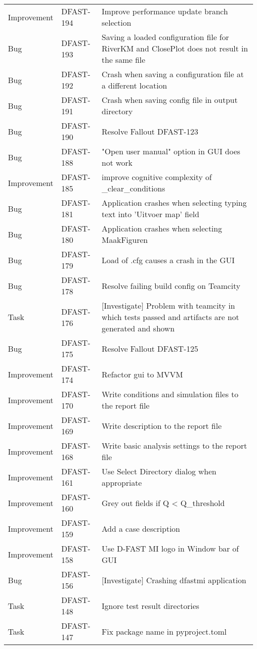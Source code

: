 \documentclass{deltares_memo}
\begin{document}
\begin{longtable}{l|l|p{8cm}}
Improvement & DFAST-194 & Improve performance update branch selection \\
Bug & DFAST-193 & Saving a loaded configuration file for RiverKM and ClosePlot does not result in the same file \\
Bug & DFAST-192 & Crash when saving a configuration file at a different location \\
Bug & DFAST-191 & Crash when saving config file in output directory \\
Bug & DFAST-190 & Resolve Fallout DFAST-123 \\
Bug & DFAST-188 & "Open user manual" option in GUI does not work \\
Improvement & DFAST-185 & improve cognitive complexity of \_clear\_conditions \\
Bug & DFAST-181 & Application crashes when selecting typing text into 'Uitvoer map' field \\
Bug & DFAST-180 & Application crashes when selecting MaakFiguren \\
Bug & DFAST-179 & Load of .cfg causes a crash in the GUI \\
Bug & DFAST-178 & Resolve failing build config on Teamcity \\
Task & DFAST-176 & [Investigate] Problem with teamcity in which tests passed and artifacts are not generated and shown \\
Bug & DFAST-175 & Resolve Fallout DFAST-125  \\
Improvement & DFAST-174 & Refactor gui to MVVM \\
Improvement & DFAST-170 & Write conditions and simulation files to the report file \\
Improvement & DFAST-169 & Write description to the report file \\
Improvement & DFAST-168 & Write basic analysis settings to the report file \\
Improvement & DFAST-161 & Use Select Directory dialog when appropriate \\
Improvement & DFAST-160 & Grey out fields if Q < Q\_threshold \\
Improvement & DFAST-159 & Add a case description \\
Improvement & DFAST-158 & Use D-FAST MI logo in Window bar of GUI \\
Bug & DFAST-156 & [Investigate] Crashing dfastmi application \\
Task & DFAST-148 & Ignore test result directories \\
Task & DFAST-147 & Fix package name in pyproject.toml \\

\end{longtable}
\end{document}
